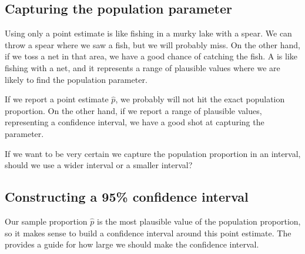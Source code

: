 \subsection{Capturing the population parameter}

Using only a point estimate is like fishing in a murky
lake with a spear. We can throw a spear where we
saw a fish, but we will probably miss. On the other hand,
if we toss a net in that area, we have a good chance of
catching the fish.
A  is like fishing with a net,
and it represents a range of plausible values where we
are likely to find the population parameter.

If we report a point estimate $\hat{p}$, we probably
will not hit the exact population proportion. On the
other hand, if we report a range of plausible values,
representing a confidence interval,
we have a good shot at capturing the parameter.

\begin{exercisewrap}
\begin{nexercise}
If we want to be very certain we capture the population
proportion in an interval, should we use a wider interval
or a smaller interval?\footnotemark
\end{nexercise}
\end{exercisewrap}

\subsection{Constructing a 95\% confidence interval}

Our sample proportion $\hat{p}$ is the most plausible
value of the population proportion, so it makes sense
to build a confidence interval around this point estimate.
The  provides a guide for how
large we should make the confidence interval.

